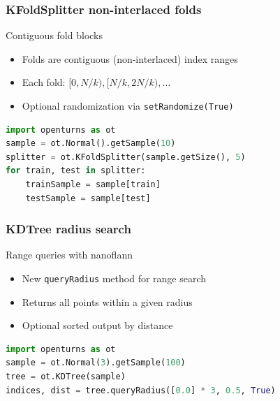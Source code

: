 \documentclass[aspectratio=169]{beamer}
\begin{document}
\begin{frame}[fragile]
\frametitle{KFoldSplitter non-interlaced folds}

\begin{block}{Contiguous fold blocks}
\begin{itemize}
\item Folds are contiguous (non-interlaced) index ranges
\item Each fold: $[0, N/k), [N/k, 2N/k), \ldots$
\item Optional randomization via \texttt{setRandomize(True)}
\end{itemize}
\end{block}

\begin{lstlisting}[language=Python]
import openturns as ot
sample = ot.Normal().getSample(10)
splitter = ot.KFoldSplitter(sample.getSize(), 5)
for train, test in splitter:
    trainSample = sample[train]
    testSample = sample[test]
\end{lstlisting}

\end{frame}

\begin{frame}[fragile]
\frametitle{KDTree radius search}

\begin{block}{Range queries with nanoflann}
\begin{itemize}
\item New \texttt{queryRadius} method for range search
\item Returns all points within a given radius
\item Optional sorted output by distance
\end{itemize}
\end{block}

\begin{lstlisting}[language=Python]
import openturns as ot
sample = ot.Normal(3).getSample(100)
tree = ot.KDTree(sample)
indices, dist = tree.queryRadius([0.0] * 3, 0.5, True)
\end{lstlisting}

\end{frame}
\end{document}
